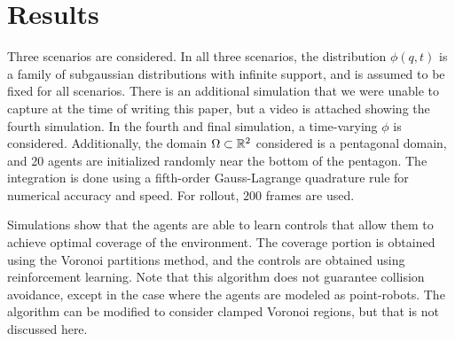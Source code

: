 \documentclass[10pt,conference]{IEEEtran}
\begin{document}
\section{Results}
Three scenarios are considered. In all three scenarios, the distribution $\phi(q,t)$ is a family of subgaussian distributions with infinite support, and is assumed to be fixed for all scenarios. There is an additional simulation that we were unable to capture at the time of writing this paper, but a video is attached showing the fourth simulation. In the fourth and final simulation, a time-varying $\phi$ is considered. Additionally, the domain $\Omega \subset \mathbb{R}^2$ considered is a pentagonal domain, and 20 agents are initialized randomly near the bottom of the pentagon. The integration is done using a fifth-order Gauss-Lagrange quadrature rule for numerical accuracy and speed. For rollout, $200$ frames are used. 

Simulations show that the agents are able to learn controls that allow them to achieve optimal coverage of the environment. The coverage portion is obtained using the Voronoi partitions method, and the controls are obtained using reinforcement learning. Note that this algorithm does not guarantee collision avoidance, except in the case where the agents are modeled as point-robots. The algorithm can be modified to consider clamped Voronoi regions, but that is not discussed here. 
\end{document}
